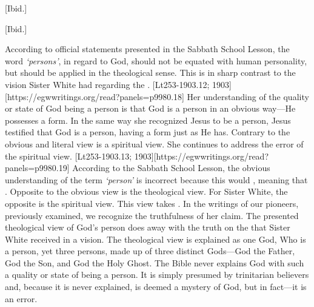 [Ibid.]


[Ibid.]


According to official statements presented in the Sabbath School Lesson, the word \textit{‘persons’},\textit{ }in regard to God, should not be equated with human personality, but should be applied in the theological sense. This is in sharp contrast to the vision Sister White had regarding the . [Lt253-1903.12; 1903][https://egwwritings.org/read?panels=p9980.18] Her understanding of the quality or state of God being a person is that God is a person in an obvious way—He possesses a form. In the same way she recognized Jesus to be a person, Jesus testified that God is a person, having a form just as He has. Contrary to the obvious and literal view is a spiritual view. She continues to address the error of the spiritual view. [Lt253-1903.13; 1903][https://egwwritings.org/read?panels=p9980.19] According to the Sabbath School Lesson, the obvious understanding of the term \textit{‘person’ }is incorrect because this would , meaning that . Opposite to the obvious view is the theological view. For Sister White, the opposite is the spiritual view. This view takes . In the writings of our pioneers, previously examined, we recognize the truthfulness of her claim. The presented theological view of God’s person does away with the truth on the  that Sister White received in a vision. The theological view is explained as one God, Who is a person, yet three persons, made up of three distinct Gods—God the Father, God the Son, and God the Holy Ghost. The Bible never explains God with such a quality or state of being a person. It is simply presumed by trinitarian believers and, because it is never explained, is deemed a mystery of God, but in fact—it is an error.


